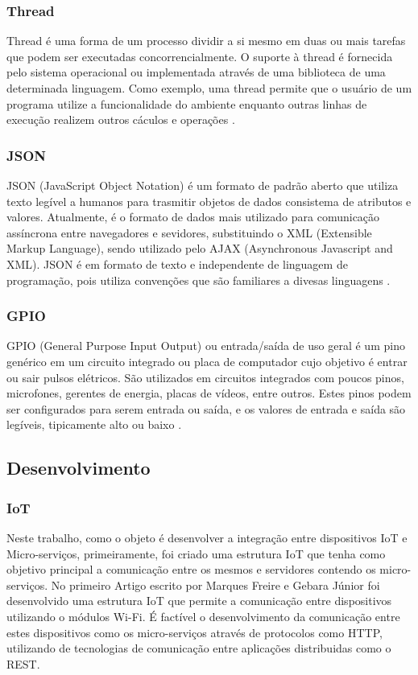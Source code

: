 \documentclass[journal]{IEEEtran}
\begin{document}
\subsubsection{Thread}
Thread é uma forma de um processo dividir a si mesmo em duas ou mais tarefas que podem ser executadas concorrencialmente. O suporte à thread é fornecida pelo sistema operacional ou implementada através de uma biblioteca de uma determinada linguagem. Como exemplo, uma thread permite que o usuário de um programa utilize a funcionalidade do ambiente enquanto outras linhas de execução realizem outros cáculos e operações \cite{tecmundothread}.

\subsubsection{JSON}
JSON (JavaScript Object Notation) é um formato de padrão aberto que utiliza texto legível a humanos para trasmitir objetos de dados consistema de atributos e valores. Atualmente, é o formato de dados mais utilizado para comunicação assíncrona entre navegadores e sevidores, substituindo o XML (Extensible Markup Language), sendo utilizado pelo AJAX (Asynchronous Javascript and XML). JSON é em formato de texto e independente de linguagem de programação, pois utiliza convenções que são familiares a divesas linguagens \cite{jsonpt}.

\subsubsection{GPIO}

GPIO (General Purpose Input Output) ou entrada/saída de uso geral é um pino genérico em um circuito integrado ou placa de computador cujo objetivo é entrar ou sair pulsos elétricos. São utilizados em circuitos integrados com poucos pinos, microfones, gerentes de energia, placas de vídeos, entre outros. Estes pinos podem ser configurados para serem entrada ou saída, e os valores de entrada e saída são legíveis, tipicamente alto ou baixo \cite[p.~3]{Sasang}.

\subsection{Desenvolvimento}
\subsubsection{IoT}

Neste trabalho, como o objeto é desenvolver a integração entre dispositivos IoT e Micro-serviços, primeiramente, foi criado uma estrutura IoT que tenha como objetivo principal a comunicação entre os mesmos e servidores contendo os micro-serviços. No primeiro Artigo escrito por Marques Freire e Gebara Júnior \cite{freiregebaraiot} foi desenvolvido uma estrutura IoT que permite a comunicação entre dispositivos utilizando o módulos Wi-Fi. É factível o desenvolvimento da comunicação entre estes dispositivos como os micro-serviços através de protocolos como HTTP, utilizando de tecnologias de comunicação entre aplicações distribuidas como o REST.
\end{document}
